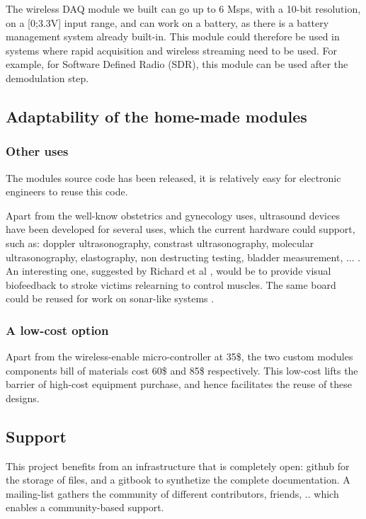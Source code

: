 \documentclass[letterpaper, 10 pt, conference]{ieeeconf} %
\begin{document}
The wireless DAQ module we built can go up to 6 Msps, with a 10-bit resolution, on a [0;3.3V] input range, and can work on a battery, as there is a battery management system already built-in. This module could therefore be used in systems where rapid acquisition and wireless streaming need to be used. For example, for Software Defined Radio (SDR), this module can be used after the demodulation step.

\subsection{Adaptability of the home-made modules}

\subsubsection{Other uses}

The modules source code has been released, it is relatively easy for electronic engineers to reuse this code. 

Apart from the well-know obstetrics and gynecology uses, ultrasound devices have been developed for several uses, which the current hardware could support, such as: doppler ultrasonography, constrast ultrasonography, molecular ultrasonography, elastography, non destructing testing, bladder measurement, ... . An interesting one, suggested by Richard et al \cite{c3}, would be to provide visual biofeedback to stroke victims relearning to control muscles. The same board could be reused for work on sonar-like systems \cite{c14}.

\subsubsection{A low-cost option}

Apart from the wireless-enable micro-controller at 35\$, the two custom modules components bill of materials cost 60\$ and 85\$ respectively. This low-cost lifts the barrier of high-cost equipment purchase, and hence facilitates the reuse of these designs.

\subsection{Support} 

This project benefits from an infrastructure that is completely open: github for the storage of files, and a gitbook to synthetize the complete documentation. A mailing-list gathers the community of different contributors, friends, .. which enables a community-based support.
\end{document}
